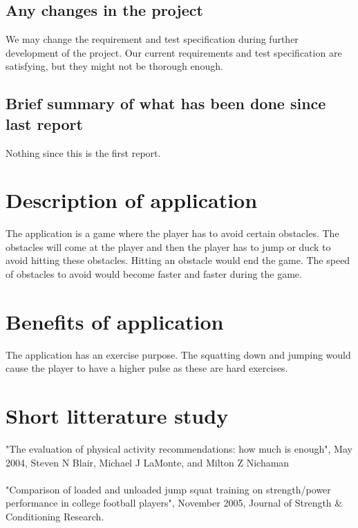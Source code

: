 \documentclass[12pt]{report}
\begin{document}
\subsection*{Any changes in the project}
We may change the requirement and test specification during further development of the project. Our current requirements and test specification are satisfying, but they might not be thorough enough.

\subsection*{Brief summary of what has been done since last report}
Nothing since this is the first report.

\section*{Description of application}
The application is a game where the player has to avoid certain obstacles. The obstacles will come at the player and then the player has to jump or duck to avoid hitting these obstacles. Hitting an obstacle would end the game. The speed of obstacles to avoid would become faster and faster during the game.

\section*{Benefits of application}
The application has an exercise purpose. The squatting down and jumping would cause the player to have a higher pulse as these are hard exercises.

\section*{Short litterature study}
"The evaluation of physical activity recommendations: how much is enough", May 2004, Steven N Blair,
Michael J LaMonte, and Milton Z Nichaman\\
${}$\\
"Comparison of loaded and unloaded jump squat training on strength/power performance in college football players", November 2005, Journal of Strength \& Conditioning Research.
\end{document}
